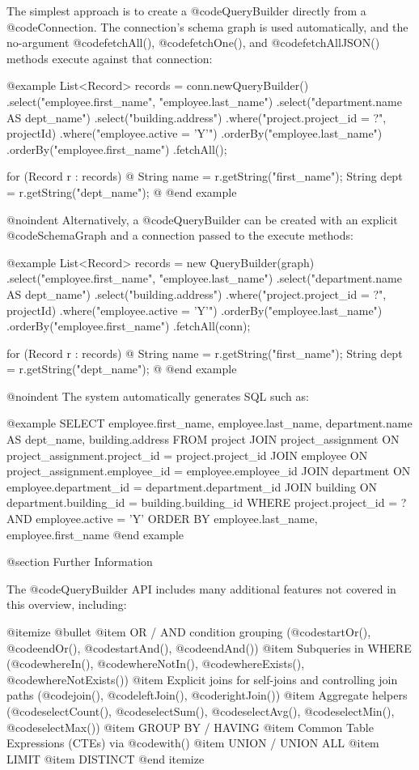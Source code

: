 The simplest approach is to create a @code{QueryBuilder} directly from
a @code{Connection}.  The connection's schema graph is used automatically,
and the no-argument @code{fetchAll()}, @code{fetchOne()}, and
@code{fetchAllJSON()} methods execute against that connection:

@example
List<Record> records = conn.newQueryBuilder()
    .select("employee.first_name", "employee.last_name")
    .select("department.name AS dept_name")
    .select("building.address")
    .where("project.project_id = ?", projectId)
    .where("employee.active = 'Y'")
    .orderBy("employee.last_name")
    .orderBy("employee.first_name")
    .fetchAll();

for (Record r : records) @{
    String name = r.getString("first_name");
    String dept = r.getString("dept_name");
@}
@end example

@noindent
Alternatively, a @code{QueryBuilder} can be created with an explicit
@code{SchemaGraph} and a connection passed to the execute methods:

@example
List<Record> records = new QueryBuilder(graph)
    .select("employee.first_name", "employee.last_name")
    .select("department.name AS dept_name")
    .select("building.address")
    .where("project.project_id = ?", projectId)
    .where("employee.active = 'Y'")
    .orderBy("employee.last_name")
    .orderBy("employee.first_name")
    .fetchAll(conn);

for (Record r : records) @{
    String name = r.getString("first_name");
    String dept = r.getString("dept_name");
@}
@end example

@noindent
The system automatically generates SQL such as:

@example
SELECT employee.first_name, employee.last_name,
       department.name AS dept_name, building.address
FROM project
JOIN project_assignment
  ON project_assignment.project_id = project.project_id
JOIN employee
  ON project_assignment.employee_id = employee.employee_id
JOIN department
  ON employee.department_id = department.department_id
JOIN building
  ON department.building_id = building.building_id
WHERE project.project_id = ?
  AND employee.active = 'Y'
ORDER BY employee.last_name, employee.first_name
@end example

@section Further Information

The @code{QueryBuilder} API includes many additional features not
covered in this overview, including:

@itemize @bullet
@item
OR / AND condition grouping (@code{startOr()}, @code{endOr()}, @code{startAnd()}, @code{endAnd()})
@item
Subqueries in WHERE (@code{whereIn()}, @code{whereNotIn()}, @code{whereExists()}, @code{whereNotExists()})
@item
Explicit joins for self-joins and controlling join paths (@code{join()}, @code{leftJoin()}, @code{rightJoin()})
@item
Aggregate helpers (@code{selectCount()}, @code{selectSum()}, @code{selectAvg()}, @code{selectMin()}, @code{selectMax()})
@item
GROUP BY / HAVING
@item
Common Table Expressions (CTEs) via @code{with()}
@item
UNION / UNION ALL
@item
LIMIT
@item
DISTINCT
@end itemize

